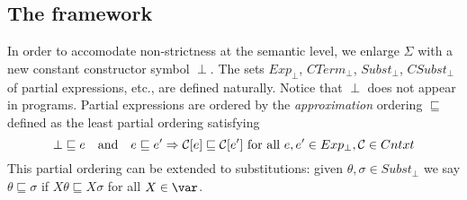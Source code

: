 \documentclass{llncs}
\begin{document}
\subsection{The \crwl{} framework}



In order to accomodate non-strictness at the semantic level, we
enlarge $\Sigma$ with a new constant constructor symbol $\perp$. The
sets $Exp_\perp$, $CTerm_\perp$, $Subst_\perp$, $CSubst_\perp$ of
partial expressions, etc., are defined naturally. Notice that $\perp$
does not appear in programs. Partial expressions are ordered by the
\emph{approximation} ordering $\sqsubseteq$ defined as the least
partial ordering satisfying
\[
  \mathop{\perp} \sqsubseteq e \quad\text{and}\quad
  e \sqsubseteq e' \Rightarrow {\cal C}[e] \sqsubseteq {\cal C}[e']
  \text{ for all } e,e' \in Exp_\perp, {\cal C} \in Cntxt
\]
This partial ordering can be extended to substitutions: given
$\theta,\sigma\in Subst_\bot$ we say $\theta\sqsubseteq\sigma$ if
$X\theta\sqsubseteq X\sigma$ for all $X\in\var$.
\end{document}
